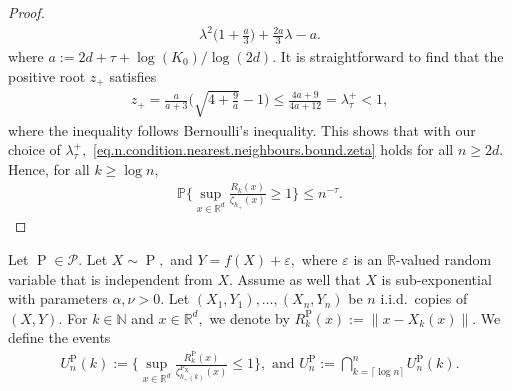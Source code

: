 \documentclass[10pt]{article}
\newcommand{\eps}{\varepsilon}
\newcommand{\mP}{\mathcal{P}}
\newcommand{\NN}{\mathbb{N}}
\newcommand{\PP}{\mathbb{P}}
\newcommand{\RR}{\mathbb{R}}
\renewcommand{\P}{\operatorname{P}}
\newcommand{\sX}{\mathrm{X}}
\begin{document}
\begin{proof}
    \begin{align*}
        \lambda^2\Big(1 + \frac{a}{3}\Big) + \frac{2a}{3}\lambda - a.
    \end{align*}
    where $a:= 2d + \tau + \log(K_0)/\log(2d).$ It is straightforward to find that the positive root $z_+$ satisfies
    \begin{align*}
        z_+ = \frac{a}{a + 3}\bigg(\sqrt{4 + \frac 9a} - 1\bigg) \leq \frac{4a + 9}{4a + 12} = \lambda_\tau^+ < 1,
    \end{align*}
    where the inequality follows Bernoulli's inequality. This shows that with our choice of $\lambda_\tau^+,$ \eqref{eq.n.condition.nearest.neighbours.bound.zeta} holds for all $n \geq 2d.$ Hence, for all $k \geq \log n,$
    \begin{align*}
        \PP\Bigg\{\sup_{x \in \RR^d}\frac{R_k(x)}{\zeta_{h_+}(x)} \geq 1\Bigg\} \leq n^{-\tau}.
    \end{align*}
\end{proof}

Let $\P \in \mP.$ Let $X \sim \P,$ and  $Y = f(X) + \eps,$ where $\eps$ is an $\RR$-valued random variable that is independent from $X.$ Assume as well that $X$ is sub-exponential with parameters $\alpha, \nu > 0.$ Let $(X_1, Y_1), \dots, (X_n, Y_n)$ be $n$ i.i.d.\ copies of $(X, Y).$ For $k \in \NN$ and $x \in \RR^d,$ we denote by $R_k^{\P}(x) := \|x - X_k(x)\|.$ We define the events
\begin{align*}
    U_n^{\P}(k) := \Bigg\{\sup_{x \in \RR^d} \frac{R_k^{\P}(x)}{\zeta^{\P_{\sX}}_{h_+(k)}(x)} \leq 1\Bigg\}, \text{ and }U_n^{\P} := \bigcap_{k = \lceil \log n\rceil}^n U^{\P}_n(k).
\end{align*}
\end{document}
